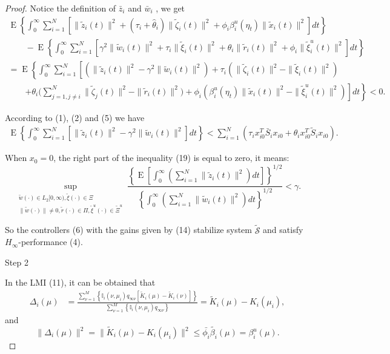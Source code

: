\documentclass[11pt,draftcls,onecolumn]{IEEEtran}
\DeclareMathOperator{\E}{E}
\begin{document}
\begin{proof}
Notice  the definition of  $\bar{z}_i$ and  $\bar{w}_i$  , we  get
\begin{multline}
\E\left\{\int_0^{\infty}\sum_{i=1}^N \left[ \|\tilde z_i(t)\|^2+(\tau_i +\hat{\theta}_i)\|\tilde\zeta_i(t)\|^2 +\phi_i \beta_i^u(\eta_t)\|\tilde{x}_i(t)\|^2 \right] dt\right\}\\
\quad\quad -\E\left\{\int_0^{\infty}\sum_{i=1}^N\left[\gamma^2\| \tilde w_i(t)\|^2+\tau_i\|\tilde\xi_i(t)\|^2 +\theta_i\|\tilde r_i(t)\|^2+\phi_i\|\tilde \xi_i^u(t)\|^2\right]dt \right\}\nonumber\\
=\E\left\{\int_0^{\infty}\sum_{i=1}^N\left[(\|\tilde z_i(t)\|^2-\gamma^2\| \tilde w_i(t)\|^2)+\tau_i(\|\tilde\zeta_i(t)\|^2-\|\tilde\xi_i(t)\|^2)\right.\right.
 \\ \quad\quad \left.+\theta_i(\sum^{N}_{j=1,j\neq i}\left. \|\tilde\zeta_j(t)\|^2-\|\tilde r_i(t)\|^2)+\phi_i(\beta_i^u(\eta_t)\|\tilde{x}_i(t)\|^2- \|\tilde \xi_i^u(t)\|^2)\right]dt\right\}
\nonumber< 0.
\end{multline}

According to (1), (2) and (5)  we  have
\begin{align}
\E\left\{\int_0^{\infty}\sum_{i=1}^N \left[ \|\tilde z_i(t)\|^2-\gamma^2\| \tilde w_i(t)\|^2 \right] dt\right\}
<
\sum_{i=1}^N\left(\tau_i x_{i0}^T\bar{S}_i x_{i0}+\theta_i x_{i0}^T\tilde{S}_i x_{i0}\right).
\end{align}

When $x_0=0$, the right part of the inequality (19) is equal to zero, it means:
\begin{equation*}
\sup_{\substack{\tilde{w}(\cdot) \in L_2[0,\infty), \tilde{\xi}(\cdot)\in \Xi  \\ \|\tilde{w}(\cdot)\| \neq 0 , \tilde{r}(\cdot) \in \Pi, \tilde{\xi}^u(\cdot) \in \tilde{\Xi}^u }} \frac{\left\{\E \left[\int_0^{\infty}(\sum_{i=1}^{N}\|\tilde z_i(t)\|^2 )dt \right]\right\}^{1/2}}{\left\{\int_0^{\infty}(\sum_{i=1}^{N}\|\tilde w_i(t)\|^2) dt\right\}^{1/2}}<\gamma.
\end{equation*}

So the controllers (6) with the gains given by (14) stabilize system  $\tilde{\mathcal{S}}$  and satisfy $H_{\infty}$-performance (4).

Step 2

\label{step 2}
In the LMI (11), it can be obtained that
\begin{align*}
\Delta_i(\mu)&=\frac
{\sum_{\nu=1}^{M}\left\{\mathbb{I}_i(\nu,\mu_i)q_{\infty\nu}
   [\tilde{K}_i(\mu)-\tilde{K}_i(\nu)]
\right\}}{\sum_{\nu=1}^{M} \left\{ \mathbb{I}_{i}(\nu,\mu_{i})q_{\infty\nu}
      \right\}}=\tilde{K}_i(\mu)-K_i(\mu_i),
\end{align*}
and
\begin{equation*}
\|\Delta_i(\mu)\|^2=\|\tilde{K}_i(\mu)-K_i(\mu_i)\|^2\leq \bar{\phi_i}\tilde{\beta_i}(\mu)=\beta_i^u(\mu).
\end{equation*}


\end{proof}
\end{document}
